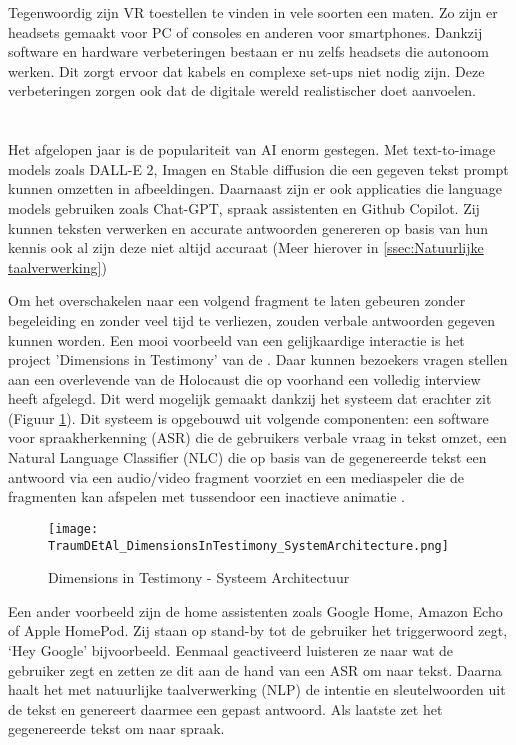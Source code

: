 Tegenwoordig zijn VR toestellen te vinden in vele soorten een maten. Zo zijn er headsets gemaakt voor PC of consoles en anderen voor smartphones. Dankzij software en hardware verbeteringen bestaan er nu zelfs headsets die autonoom werken. Dit zorgt ervoor dat kabels en complexe set-ups niet nodig zijn. Deze verbeteringen zorgen ook dat de digitale wereld realistischer doet aanvoelen.

\section{}%
Het afgelopen jaar is de populariteit van AI enorm gestegen. Met text-to-image models zoals DALL-E 2, Imagen en Stable diffusion die een gegeven tekst prompt kunnen omzetten in afbeeldingen. Daarnaast zijn er ook applicaties die language models gebruiken zoals Chat-GPT, spraak assistenten en Github Copilot. Zij kunnen teksten verwerken en accurate antwoorden genereren op basis van hun kennis ook al zijn deze niet altijd accuraat (Meer hierover in \ref{ssec:Natuurlijke taalverwerking})

Om het overschakelen naar een volgend fragment te laten gebeuren zonder begeleiding en zonder veel tijd te verliezen, zouden verbale antwoorden gegeven kunnen worden. Een mooi voorbeeld van een gelijkaardige interactie is het project 'Dimensions in Testimony' van de \textcite{USCShoahFoundation2020}. Daar kunnen bezoekers vragen stellen aan een overlevende van de Holocaust die op voorhand een volledig interview heeft afgelegd. Dit werd mogelijk gemaakt dankzij het systeem dat erachter zit (Figuur \ref{fig:DiTArchitecture}). Dit systeem is opgebouwd uit volgende componenten: een software voor spraakherkenning (ASR) die de gebruikers verbale vraag in tekst omzet, een Natural Language Classifier (NLC) die op basis van de gegenereerde tekst een antwoord via een audio/video fragment voorziet en een mediaspeler die de fragmenten kan afspelen met tussendoor een inactieve animatie \autocite{Traum2015}.

\begin{figure}[h]
    \centering
    \texttt{[image: TraumDEtAl\_DimensionsInTestimony\_SystemArchitecture.png]}
    \caption{Dimensions in Testimony - Systeem Architectuur \autocite{Traum2015}}
    \label{fig:DiTArchitecture}
\end{figure}

Een ander voorbeeld zijn de home assistenten zoals Google Home, Amazon Echo of Apple HomePod. Zij staan op stand-by tot de gebruiker het triggerwoord zegt, `Hey Google' bijvoorbeeld. Eenmaal geactiveerd luisteren ze naar wat de gebruiker zegt en zetten ze dit aan de hand van een ASR om naar tekst. Daarna haalt het met natuurlijke taalverwerking (NLP) de intentie en sleutelwoorden uit de tekst en genereert daarmee een gepast antwoord. Als laatste zet het gegenereerde tekst om naar spraak.

